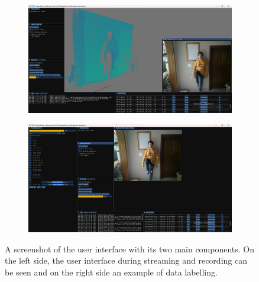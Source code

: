 \begin{figure}
  \centering
  \begin{subfigure}[b]{0.49\linewidth}
      \centering
      \includegraphics[width=\textwidth]{figures/FESDData/streaming.png}
  \end{subfigure}
  \hfill
  \begin{subfigure}[b]{0.49\linewidth}
      \centering
      \includegraphics[width=\textwidth]{figures/FESDData/labelling.png}
  \end{subfigure}
  \caption[FESDData user interface]{A screenshot of the user interface with its two main components. On the left side, the user interface during streaming and recording can be seen and on the right side an example of data labelling.}
  \label{fig:fesddata}
\end{figure}  
